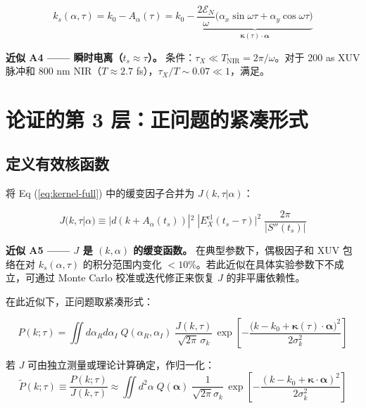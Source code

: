 \documentclass[12pt,a4paper]{ctexart}
\begin{document}
\begin{equation}\label{eq:classical-map}
k_s(\alpha,\tau) = k_0 - A_\alpha(\tau)
= k_0 - \underbrace{\frac{2\mathcal{E}_N}{\omega}\bigl(\alpha_x\sin\omega\tau + \alpha_y\cos\omega\tau\bigr)}_{\boldsymbol{\kappa}(\tau)\cdot\boldsymbol{\alpha}}
\end{equation}

\begin{approxbox}
\textbf{近似 A4 —— 瞬时电离（$t_s \approx \tau$）。} 条件：$\tau_X \ll T_{\text{NIR}} = 2\pi/\omega$。对于 200 as XUV 脉冲和 800 nm NIR（$T\approx 2.7$ fs），$\tau_X/T \sim 0.07 \ll 1$，满足。
\end{approxbox}

\section{论证的第 3 层：正问题的紧凑形式}

\subsection{定义有效核函数}

将 Eq (\ref{eq:kernel-full}) 中的缓变因子合并为 $J(k,\tau|\alpha)$：

\begin{equation}\label{eq:Jdef}
J(k,\tau|\alpha) \equiv
|d(k+A_\alpha(t_s))|^2\;
|E_X^{\text{cl}}(t_s-\tau)|^2\;
\frac{2\pi}{|S''(t_s)|}
\end{equation}

\begin{approxbox}
\textbf{近似 A5 —— $J$ 是 $(k,\alpha)$ 的缓变函数。} 在典型参数下，偶极因子和 XUV 包络在对 $k_s(\alpha,\tau)$ 的积分范围内变化 $< 10\%$。若此近似在具体实验参数下不成立，可通过 Monte Carlo 校准或迭代修正来恢复 $J$ 的非平庸依赖性。
\end{approxbox}

在此近似下，正问题取紧凑形式：

\begin{keybox}
\[
\boxed{
P(k;\tau) = \iint d\alpha_R d\alpha_I\;
Q(\alpha_R,\alpha_I)\;
\frac{J(k,\tau)}{\sqrt{2\pi}\,\sigma_k}\,
\exp\!\left[-\frac{\bigl(k - k_0 + \boldsymbol{\kappa}(\tau)\!\cdot\!\boldsymbol{\alpha}\bigr)^2}{2\sigma_k^2}\right]
}
\]
\end{keybox}

若 $J$ 可由独立测量或理论计算确定，作归一化：
\begin{equation}
\tilde{P}(k;\tau) \equiv \frac{P(k;\tau)}{J(k,\tau)} \approx
\iint d^2\alpha\; Q(\boldsymbol{\alpha})\;
\frac{1}{\sqrt{2\pi}\sigma_k}\,
\exp\!\left[-\frac{(k - k_0 + \boldsymbol{\kappa}\!\cdot\!\boldsymbol{\alpha})^2}{2\sigma_k^2}\right]
\end{equation}
\end{document}
